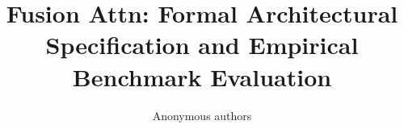 \title{\textbf{Fusion Attn: Formal Architectural Specification and Empirical Benchmark Evaluation}}

\author{Anonymous authors}
